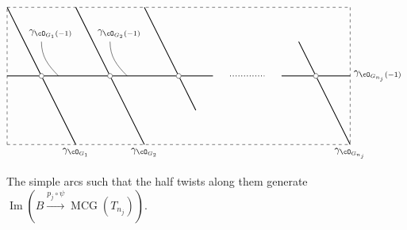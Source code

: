 \documentclass[12pt]{amsart}
\numberwithin{equation}{section}
\theoremstyle{plain}
\theoremstyle{definition}
\DeclareMathOperator{\MCG}{\mathrm{MCG}}
\DeclareMathOperator{\Image}{\mathrm{Im}}
\begin{document}
\begin{figure}[h]
    \centering
    \begin{displaymath}
        \begin{tikzpicture}[scale=1.2]
            \draw[dashed] (0,0)--(10,0);
            \draw[dashed] (0,0)--(0,4);
            \draw[dashed] (0,4)--(10,4);
            \draw[dashed] (10,4)--(10,0);

            \draw[thick] (0, 2)--(1, 2);
            \draw[thick] (1, 2)--(3, 2);
            \draw[thick] (3, 2)--(5, 2);
            \draw[thick] (5, 2)--(6, 2);
            \draw[thick] (8, 2)--(9, 2);
            \draw[thick] (9, 2)--(10, 2);


            \draw[thick] (0, 4)--(1, 2);
            \draw[thick] (1, 2)--(2, 0);
            \draw[thick] (2, 4)--(4, 0);
            \draw[thick] (4, 4)--(5, 2);
            \draw[thick] (5, 2)--(5.5, 1);
            \draw[thick] (8.5, 3)--(9, 2);
            \draw[thick] (9, 2)--(10, 0);

            \draw[dotted, thick] (5+1.5, 2)--(9-1.5, 2);
            \foreach \u in {1, 3, 5, 9}
                {
                    \filldraw[white] (\u, 2) circle (2pt);
                    \draw[black] (\u, 2) circle (2pt);
                }

            \draw(2, 0) node[below]{$\gamma_{\cO_{G_1}}$};
            \draw(4, 0) node[below]{$\gamma_{\cO_{G_2}}$};
            \draw(10, 0) node[below]{$\gamma_{\cO_{G_{n_j}}}$};

            \draw(2, 3) node[above left]{$\gamma_{\cO_{G_1}(-1)}$};
            \draw(1, 3) to[out=-90,in=135](1.5, 2);
            \draw(4, 3) node[above left]{$\gamma_{\cO_{G_2}(-1)}$};
            \draw(3, 3) to[out=-90,in=135](3.5, 2);

            \draw(10, 2) node[right]{$\gamma_{\cO_{G_{n_j}}(-1)}$};

        \end{tikzpicture}
    \end{displaymath}
    \caption{The simple arcs such that the half twists along them generate $\Image(B \xrightarrow{p_j \circ \psi} \MCG(T_{n_j}))$.} \label{fig:generators-for-image-of-B}
\end{figure}
\end{document}
